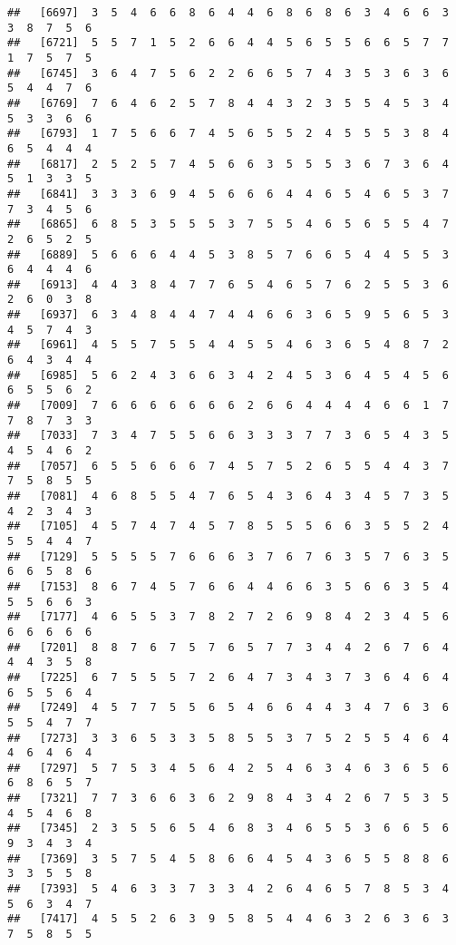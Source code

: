 \documentclass[
]{book}
\begin{document}
\begin{verbatim}
##   [6697]  3  5  4  6  6  8  6  4  4  6  8  6  8  6  3  4  6  6  3  3  8  7  5  6
##   [6721]  5  5  7  1  5  2  6  6  4  4  5  6  5  5  6  6  5  7  7  1  7  5  7  5
##   [6745]  3  6  4  7  5  6  2  2  6  6  5  7  4  3  5  3  6  3  6  5  4  4  7  6
##   [6769]  7  6  4  6  2  5  7  8  4  4  3  2  3  5  5  4  5  3  4  5  3  3  6  6
##   [6793]  1  7  5  6  6  7  4  5  6  5  5  2  4  5  5  5  3  8  4  6  5  4  4  4
##   [6817]  2  5  2  5  7  4  5  6  6  3  5  5  5  3  6  7  3  6  4  5  1  3  3  5
##   [6841]  3  3  3  6  9  4  5  6  6  6  4  4  6  5  4  6  5  3  7  7  3  4  5  6
##   [6865]  6  8  5  3  5  5  5  3  7  5  5  4  6  5  6  5  5  4  7  2  6  5  2  5
##   [6889]  5  6  6  6  4  4  5  3  8  5  7  6  6  5  4  4  5  5  3  6  4  4  4  6
##   [6913]  4  4  3  8  4  7  7  6  5  4  6  5  7  6  2  5  5  3  6  2  6  0  3  8
##   [6937]  6  3  4  8  4  4  7  4  4  6  6  3  6  5  9  5  6  5  3  4  5  7  4  3
##   [6961]  4  5  5  7  5  5  4  4  5  5  4  6  3  6  5  4  8  7  2  6  4  3  4  4
##   [6985]  5  6  2  4  3  6  6  3  4  2  4  5  3  6  4  5  4  5  6  6  5  5  6  2
##   [7009]  7  6  6  6  6  6  6  6  2  6  6  4  4  4  4  6  6  1  7  7  8  7  3  3
##   [7033]  7  3  4  7  5  5  6  6  3  3  3  7  7  3  6  5  4  3  5  4  5  4  6  2
##   [7057]  6  5  5  6  6  6  7  4  5  7  5  2  6  5  5  4  4  3  7  7  5  8  5  5
##   [7081]  4  6  8  5  5  4  7  6  5  4  3  6  4  3  4  5  7  3  5  4  2  3  4  3
##   [7105]  4  5  7  4  7  4  5  7  8  5  5  5  6  6  3  5  5  2  4  5  5  4  4  7
##   [7129]  5  5  5  5  7  6  6  6  3  7  6  7  6  3  5  7  6  3  5  6  6  5  8  6
##   [7153]  8  6  7  4  5  7  6  6  4  4  6  6  3  5  6  6  3  5  4  5  5  6  6  3
##   [7177]  4  6  5  5  3  7  8  2  7  2  6  9  8  4  2  3  4  5  6  6  6  6  6  6
##   [7201]  8  8  7  6  7  5  7  6  5  7  7  3  4  4  2  6  7  6  4  4  4  3  5  8
##   [7225]  6  7  5  5  5  7  2  6  4  7  3  4  3  7  3  6  4  6  4  6  5  5  6  4
##   [7249]  4  5  7  7  5  5  6  5  4  6  6  4  4  3  4  7  6  3  6  5  5  4  7  7
##   [7273]  3  3  6  5  3  3  5  8  5  5  3  7  5  2  5  5  4  6  4  4  6  4  6  4
##   [7297]  5  7  5  3  4  5  6  4  2  5  4  6  3  4  6  3  6  5  6  6  8  6  5  7
##   [7321]  7  7  3  6  6  3  6  2  9  8  4  3  4  2  6  7  5  3  5  4  5  4  6  8
##   [7345]  2  3  5  5  6  5  4  6  8  3  4  6  5  5  3  6  6  5  6  9  3  4  3  4
##   [7369]  3  5  7  5  4  5  8  6  6  4  5  4  3  6  5  5  8  8  6  3  3  5  5  8
##   [7393]  5  4  6  3  3  7  3  3  4  2  6  4  6  5  7  8  5  3  4  5  6  3  4  7
##   [7417]  4  5  5  2  6  3  9  5  8  5  4  4  6  3  2  6  3  6  3  7  5  8  5  5

\end{verbatim}
\end{document}
